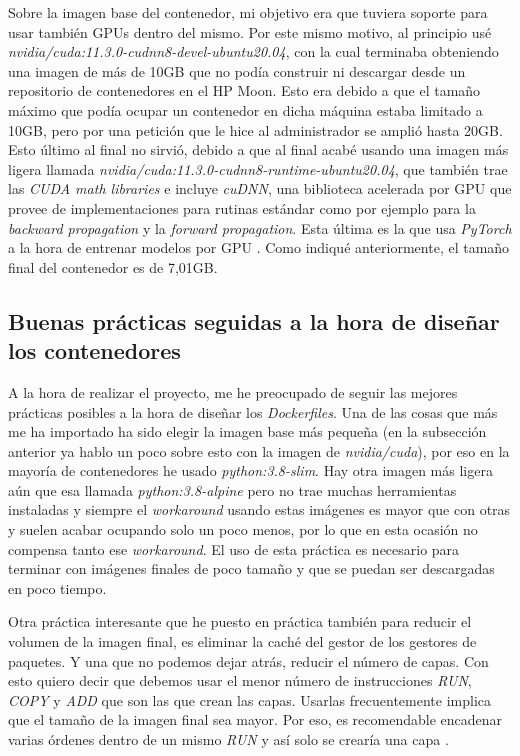 Sobre la imagen base del contenedor, mi objetivo era que tuviera soporte para usar también GPUs dentro del mismo. Por este mismo motivo, al principio usé \textit{nvidia/cuda:11.3.0-cudnn8-devel-ubuntu20.04}, con la cual terminaba obteniendo una imagen de más de 10GB que no podía construir ni descargar desde un repositorio de contenedores en el HP Moon. Esto era debido a que el tamaño máximo que podía ocupar un contenedor en dicha máquina estaba limitado a 10GB, pero por una petición que le hice al administrador se amplió hasta 20GB. Esto último al final no sirvió, debido a que al final acabé usando una imagen más ligera llamada \textit{nvidia/cuda:11.3.0-cudnn8-runtime-ubuntu20.04}, que también trae las \textit{CUDA math libraries} e incluye \textit{cuDNN}, una biblioteca acelerada por GPU que provee de implementaciones para rutinas estándar como por ejemplo para la \textit{backward propagation} y la \textit{forward propagation}. Esta última es la que usa \textit{PyTorch} a la hora de entrenar modelos por GPU \cite{cudnn}. Como indiqué anteriormente, el tamaño final del contenedor es de 7,01GB.

\subsection{Buenas prácticas seguidas a la hora de diseñar los contenedores}

A la hora de realizar el proyecto, me he preocupado de seguir las mejores prácticas posibles a la hora de diseñar los \textit{Dockerfiles}. Una de las cosas que más me ha importado ha sido elegir la imagen base más pequeña \cite{dockerbestpracticesdev} (en la subsección anterior ya hablo un poco sobre esto con la imagen de \textit{nvidia/cuda}), por eso en la mayoría de contenedores he usado \textit{python:3.8-slim}. Hay otra imagen más ligera aún que esa llamada \textit{python:3.8-alpine} pero no trae muchas herramientas instaladas y siempre el \textit{workaround} usando estas imágenes es mayor que con otras y suelen acabar ocupando solo un poco menos, por lo que en esta ocasión no compensa tanto ese \textit{workaround}. El uso de esta práctica es necesario para terminar con imágenes finales de poco tamaño y que se puedan ser descargadas en poco tiempo.\newline

Otra práctica interesante que he puesto en práctica también para reducir el volumen de la imagen final, es eliminar la caché del gestor de los gestores de paquetes. Y una que no podemos dejar atrás, reducir el número de capas. Con esto quiero decir que debemos usar el menor número de instrucciones \textit{RUN}, \textit{COPY} y \textit{ADD} que son las que crean las capas. Usarlas frecuentemente implica que el tamaño de la imagen final sea mayor. Por eso, es recomendable encadenar varias órdenes dentro de un mismo \textit{RUN} y así solo se crearía una capa \cite{dockerbestpractices}.\newline

